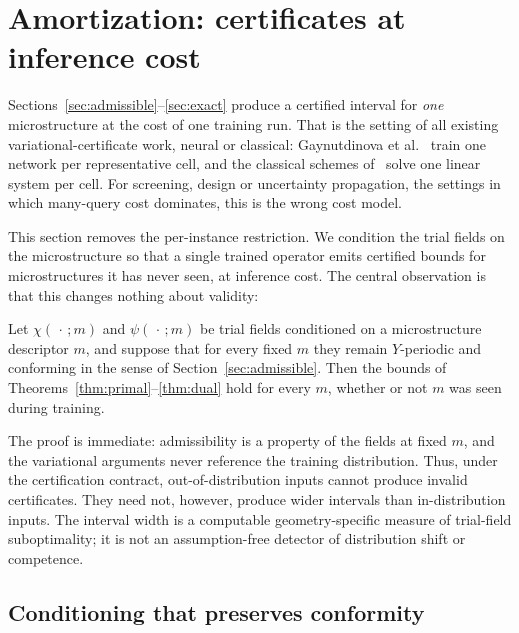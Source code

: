 
\section{Amortization: certificates at inference cost}
\label{sec:amortized}

Sections~\ref{sec:admissible}--\ref{sec:exact} produce a certified interval
for \emph{one} microstructure at the cost of one training run. That is the
setting of all existing variational-certificate work, neural or classical:
Gaynutdinova et al.~\cite{Gaynutdinova2026} train one network per
representative cell, and the classical schemes
of~\cite{Gaynutdinova2023} solve one linear system per
cell. For screening, design or uncertainty propagation, the settings in which many-query cost dominates, this is the wrong cost model.

This section removes the per-instance restriction. We condition the trial
fields on the microstructure so that a single trained operator emits
certified bounds for microstructures it has never seen, at inference cost.
The central observation is that this changes nothing about validity:

\begin{proposition}
\label{prop:amortized}
Let $\chi(\,\cdot\,;m)$ and $\psi(\,\cdot\,;m)$ be trial fields
conditioned on a microstructure descriptor $m$, and suppose that for every
fixed $m$ they remain $Y$-periodic and conforming in the sense of
Section~\ref{sec:admissible}. Then the bounds of
Theorems~\ref{thm:primal}--\ref{thm:dual} hold for every $m$, whether or
not $m$ was seen during training.
\end{proposition}

The proof is immediate: admissibility is a property of the fields at fixed
$m$, and the variational arguments never reference the training distribution.
Thus, under the certification contract, out-of-distribution inputs cannot
produce invalid certificates. They need not, however, produce wider
intervals than in-distribution inputs. The interval width is a computable
geometry-specific measure of trial-field suboptimality; it is not an
assumption-free detector of distribution shift or competence.

\subsection{Conditioning that preserves conformity}
\label{sec:amortized:conditioning}

